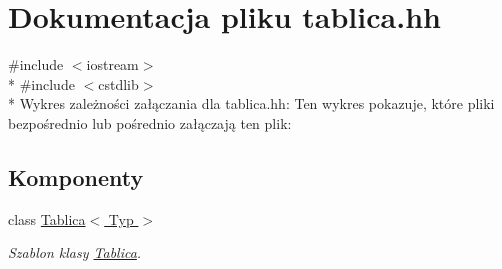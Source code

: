 \hypertarget{tablica_8hh}{\section{Dokumentacja pliku tablica.\-hh}
\label{tablica_8hh}
}
{\ttfamily \#include $<$iostream$>$}\\*
{\ttfamily \#include $<$cstdlib$>$}\\*
Wykres zależności załączania dla tablica.\-hh\-:
Ten wykres pokazuje, które pliki bezpośrednio lub pośrednio załączają ten plik\-:
\subsection*{Komponenty}
\begin{DoxyCompactItemize}
\item 
class \hyperlink{class_tablica}{Tablica$<$ Typ $>$}
\begin{DoxyCompactList}\small\item\em Szablon klasy \hyperlink{class_tablica}{Tablica}. \end{DoxyCompactList}\end{DoxyCompactItemize}
